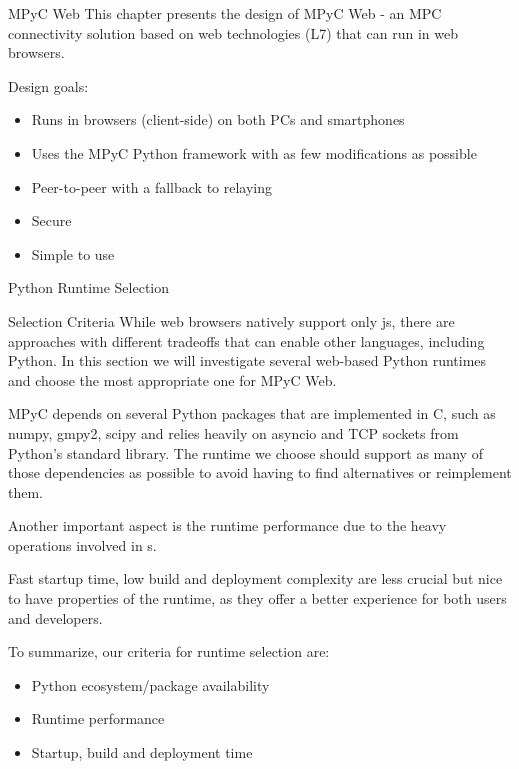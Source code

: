 \label{thesis__090-mpyc-web.md}
\begin{block}{MPyC Web}
\label{thesis__090-mpyc-web.md__mpyc-web}
This chapter presents the design of MPyC Web - an MPC connectivity solution based on web technologies (L7) that can run in web browsers.

Design goals:

\begin{itemize}
\tightlist
\item
  Runs in browsers (client-side) on both PCs and smartphones
\item
  Uses the MPyC Python framework with as few modifications as possible
\item
  Peer-to-peer with a fallback to relaying
\item
  Secure
\item
  Simple to use
\end{itemize}

\begin{block}{Python Runtime Selection}
\label{thesis__090-mpyc-web.md__python-runtime-selection}
\begin{block}{Selection Criteria}
\label{thesis__090-mpyc-web.md__selection-criteria}
While web browsers natively support only \gls{js}, there are approaches with different tradeoffs that can enable other languages, including Python. In this section we will investigate several web-based Python runtimes and choose the most appropriate one for MPyC Web.

MPyC depends on several Python packages that are implemented in C, such as numpy, gmpy2, scipy and relies heavily on asyncio and TCP sockets from Python's standard library. The runtime we choose should support as many of those dependencies as possible to avoid having to find alternatives or reimplement them.

Another important aspect is the runtime performance due to the heavy operations involved in s.

Fast startup time, low build and deployment complexity are less crucial but nice to have properties of the runtime, as they offer a better experience for both users and developers.

To summarize, our criteria for runtime selection are:

\begin{itemize}
\tightlist
\item
  Python ecosystem/package availability
\item
  Runtime performance
\item
  Startup, build and deployment time
\end{itemize}
\end{block}


\end{block}
\end{block}
